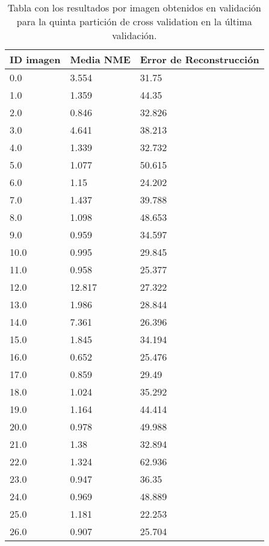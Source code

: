 \begin{table}[!ht]
    \centering
    \caption{Tabla con los resultados por imagen obtenidos en validación para la quinta partición de cross validation en la última validación.}
    \begin{tabular}{|l|l|l|}
    \hline
        ID imagen & Media NME & Error de Reconstrucción \\ \hline
        0.0 & 3.554 & 31.75 \\ \hline
        1.0 & 1.359 & 44.35 \\ \hline
        2.0 & 0.846 & 32.826 \\ \hline
        3.0 & 4.641 & 38.213 \\ \hline
        4.0 & 1.339 & 32.732 \\ \hline
        5.0 & 1.077 & 50.615 \\ \hline
        6.0 & 1.15 & 24.202 \\ \hline
        7.0 & 1.437 & 39.788 \\ \hline
        8.0 & 1.098 & 48.653 \\ \hline
        9.0 & 0.959 & 34.597 \\ \hline
        10.0 & 0.995 & 29.845 \\ \hline
        11.0 & 0.958 & 25.377 \\ \hline
        12.0 & 12.817 & 27.322 \\ \hline
        13.0 & 1.986 & 28.844 \\ \hline
        14.0 & 7.361 & 26.396 \\ \hline
        15.0 & 1.845 & 34.194 \\ \hline
        16.0 & 0.652 & 25.476 \\ \hline
        17.0 & 0.859 & 29.49 \\ \hline
        18.0 & 1.024 & 35.292 \\ \hline
        19.0 & 1.164 & 44.414 \\ \hline
        20.0 & 0.978 & 49.988 \\ \hline
        21.0 & 1.38 & 32.894 \\ \hline
        22.0 & 1.324 & 62.936 \\ \hline
        23.0 & 0.947 & 36.35 \\ \hline
        24.0 & 0.969 & 48.889 \\ \hline
        25.0 & 1.181 & 22.253 \\ \hline
        26.0 & 0.907 & 25.704 \\ \hline
    \end{tabular}
    \label{table:Daugmentation_images_5}
\end{table}

\endinput
